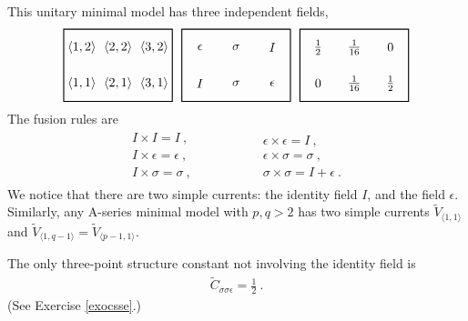\documentclass[12pt, a4paper, notitlepage, twoside]{report}
\numberwithin{equation}{section}
\theoremstyle{break}
\begin{document}
This unitary minimal model has three independent fields, 
\begin{align}
 \begin{tikzpicture}[scale = .5, baseline=(current  bounding  box.center)]
  \draw[thick] (-1,-1) -- (-1, 3) -- (5, 3) -- (5, -1) -- cycle;
  \foreach \x in {1, ..., 3}{
  \foreach \y in {1, 2}{
  \node at ({2*(\x-1)}, {2*(\y-1)}) {$\langle \x,\y\rangle $};
  }}
 \end{tikzpicture}
 \ \ 
 \begin{tikzpicture}[scale = .5, baseline=(current  bounding  box.center)]
  \draw[thick] (-1,-1) -- (-1, 3) -- (5, 3) -- (5, -1) -- cycle;
  \node at (0, 0) {$I$};
  \node at (2, 0) {$\sigma$};
  \node at (4, 0) {$\epsilon$};
  \node at (0, 2) {$\epsilon$};
  \node at (2, 2) {$\sigma$};
  \node at (4, 2) {$I$};
 \end{tikzpicture}
 \ \ 
 \begin{tikzpicture}[scale = .5, baseline=(current  bounding  box.center)]
  \draw[thick] (-1,-1) -- (-1, 3) -- (5, 3) -- (5, -1) -- cycle;
  \node at (0, 0) {$0$};
  \node at (2, 0) {$\frac{1}{16}$};
  \node at (4, 0) {$\frac12$};
  \node at (0, 2) {$\frac12$};
  \node at (2, 2) {$\frac{1}{16}$};
  \node at (4, 2) {$0$};
 \end{tikzpicture}
\end{align}
The fusion rules are 
\begin{align}
\begin{array}{l}
 I\times I = I \ ,
\\ I\times \epsilon = \epsilon\ ,
\\ I\times \sigma = \sigma\ ,
\end{array}
\hspace{2cm}
\begin{array}{l}
 \epsilon\times \epsilon = I\ ,
\\ \epsilon\times \sigma = \sigma\ ,
\\ \sigma \times \sigma = I + \epsilon\ .
\end{array}
\end{align}
We notice that there are two simple currents: the identity field $I$, and the field $\epsilon$.
Similarly, any A-series minimal model with $p,q>2$ has two simple currents $\tilde{V}_{\langle 1,1 \rangle}$ and $\tilde{V}_{\langle 1,q-1 \rangle}=\tilde{V}_{\langle p-1,1 \rangle}$. 

The only three-point structure constant not involving the identity field is 
\begin{align}
 \tilde{C}_{\sigma\sigma\epsilon} =\frac12\ .
\label{csse}
\end{align}
(See Exercise \ref{exocsse}.)
\end{document}
